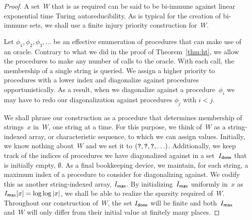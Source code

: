 \begin{proof}
  A set~$W$ that is as required can be said to be bi-immune against linear exponential time Turing autoreducibility.
  As is typical for the creation of bi-immune sets, we shall use a finite injury priority construction \parencite[see][Section~2.11]{downey2010algorithmic} for~$W$.

  Let $\phi_1, \phi_2, \phi_3, \ldots$ be an effective enumeration of procedures that can make use of an oracle.
  Contrary to what we did in the proof of Theorem~\ref{thm:ht}, we allow the procedures to make any number of calls to the oracle.
  With each call, the membership of a single string is queried.
  We assign a higher priority to procedures with a lower index and diagonalize against procedures opportunistically.
  As a result, when we diagonalize against a procedure~$\phi_i$ we may have to redo our diagonalization against procedures $\phi_j$ with $i < j$.

  We shall phrase our construction as a procedure that determines membership of strings~$x$ in~$W$, one string at a time.
  For this purpose, we think of~$W$ as a string-indexed array, or characteristic sequence, to which we can assign values.
  Initially, we know nothing about~$W$ and we set it to $(\textnormal{\texttt{?}}, \textnormal{\texttt{?}}, \textnormal{\texttt{?}}, \ldots)$.
  Additionally, we keep track of the indices of procedures we have diagonalized against in a set~$I_\textsf{done}$ that is initially empty, $\emptyset$.
  As a final bookkeeping device, we maintain, for each string, a maximum index of a procedure to consider for diagonalizing against.
  We codify this as another string-indexed array, $I_\textsf{max}$.
  By initializing~$I_\textsf{max}$ uniformly in~$x$ as~$I_\textsf{max}[x] = \log \log {\lvert x\rvert}$, we shall be able to realize the sparsity required of~$W$.
  Throughout our construction of~$W$, the set $I_\textsf{done}$ will be finite and both~$I_\textsf{max}$ and~$W$ will only differ from their initial value at finitely many places.


\end{proof}
